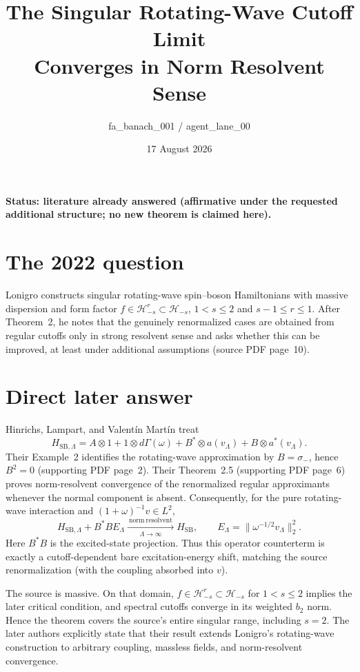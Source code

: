 \documentclass[10pt]{article}
\title{The Singular Rotating-Wave Cutoff Limit\\
Converges in Norm Resolvent Sense}
\author{fa\_banach\_001 / agent\_lane\_00}
\date{17 August 2026}
\newcommand{\Hs}{\mathcal H}
\begin{document}
\maketitle
\vspace{-1.3em}
\small

\noindent\textbf{Status: literature already answered (affirmative under the
requested additional structure; no new theorem is claimed here).}

\section*{The 2022 question}

Lonigro constructs singular rotating-wave spin--boson Hamiltonians with
massive dispersion and form factor $f\in\Hs^r_{-s}\subset\Hs_{-s}$,
$1<s\le2$ and $s-1\le r\le1$.  After
Theorem~2, he notes that the genuinely renormalized cases are obtained from
regular cutoffs only in strong resolvent sense and asks whether this can be
improved, at least under additional assumptions \cite{Lon} (source PDF
page~10).

\section*{Direct later answer}

Hinrichs, Lampart, and Valent\'in Mart\'in treat
\[
 H_{\mathrm{SB},\Lambda}=A\otimes1+1\otimes d\Gamma(\omega)
   +B^*\otimes a(v_\Lambda)+B\otimes a^*(v_\Lambda).
\]
Their Example~2 identifies the rotating-wave approximation by
$B=\sigma_-$, hence $B^2=0$ \cite{HLV} (supporting PDF page~2).  Their
Theorem~2.5 (supporting PDF page~6) proves norm-resolvent convergence of the
renormalized regular approximants whenever the normal component is absent.
Consequently, for the pure rotating-wave interaction and
$(1+\omega)^{-1}v\in L^2$,
\[
 H_{\mathrm{SB},\Lambda}+B^*B E_\Lambda
    \xrightarrow[\Lambda\to\infty]{\ \mathrm{norm\ resolvent}\ }
 H_{\mathrm{SB}},
 \qquad E_\Lambda=\|\omega^{-1/2}v_\Lambda\|_2^2.
\]
Here $B^*B$ is the excited-state projection.  Thus this operator counterterm
is exactly a cutoff-dependent bare excitation-energy shift, matching the
source renormalization (with the coupling absorbed into $v$).

The source is massive.  On that domain, $f\in\Hs^r_{-s}\subset\Hs_{-s}$ for
$1<s\le2$ implies the later critical condition, and spectral cutoffs converge
in its weighted $b_2$ norm.  Hence the theorem covers the source's entire
singular range, including $s=2$.  The later authors explicitly state that
their result extends Lonigro's rotating-wave construction to arbitrary
coupling, massless fields, and norm-resolvent convergence.
\end{document}
